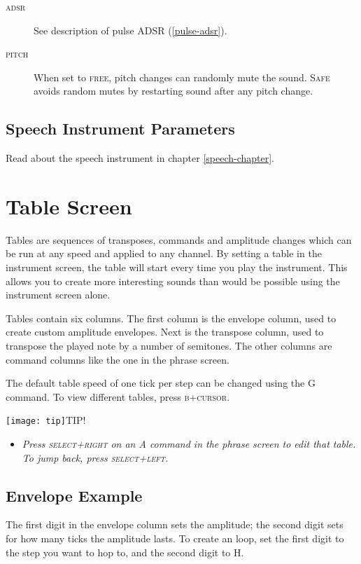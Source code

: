 \begin{description}
	\item[\textsc{adsr}] See description of pulse ADSR (\ref{pulse-adsr}).
	\item[\textsc{pitch}] When set to \textsc{free}, pitch changes can randomly mute the sound. \textsc{Safe} avoids random mutes by restarting sound after any pitch change.
\end{description}

\subsection{Speech Instrument Parameters}

Read about the speech instrument in chapter \ref{speech-chapter}.

\section{Table Screen}

Tables are sequences of transposes, commands and amplitude changes which can be run at any speed and applied to any channel. By setting a table in the instrument screen, the table will start every time you play the instrument. This allows you to create more interesting sounds than would be possible using the instrument screen alone.

Tables contain six columns. The first column is the envelope column, used to create custom amplitude envelopes. Next is the transpose column, used to transpose the played note by a number of semitones. The other columns are command columns like the one in the phrase screen.

The default table speed of one tick per step can be changed using the G command. To view different tables, press \textsc{b+cursor}.

\texttt{[image: tip]}TIP!
\begin{itemize}
	\item \textit{Press \textsc{select+right} on an A command in the phrase screen to edit that table. To jump back, press \textsc{select+left}.}
\end{itemize}

\subsection{Envelope Example}

The first digit in the envelope column sets the amplitude; the second digit sets for how many ticks the amplitude lasts.
To create an loop, set the first digit to the step you want to hop to, and the second digit to \textsc{H}.

